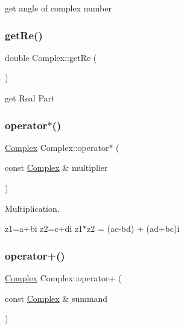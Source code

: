 get angle of complex number 

\mbox{\label{class_complex_a5e43de61a58eab8420b70eb2974e6b0b}} 
\subsubsection{\texorpdfstring{get\+Re()}{getRe()}}
{\footnotesize\ttfamily double Complex\+::get\+Re (\begin{DoxyParamCaption}{ }\end{DoxyParamCaption})}



get Real Part 

\mbox{\label{class_complex_a99935ad84f8b979344d68485c42462c7}} 
\subsubsection{\texorpdfstring{operator$\ast$()}{operator*()}}
{\footnotesize\ttfamily \mbox{\hyperlink{class_complex}{Complex}} Complex\+::operator$\ast$ (\begin{DoxyParamCaption}\item[{const \mbox{\hyperlink{class_complex}{Complex}} \&}]{multiplier }\end{DoxyParamCaption})}



Multiplication. 

z1=a+bi z2=c+di z1$\ast$z2 = (ac-\/bd) + (ad+bc)i \mbox{\label{class_complex_a4c1189414fa16c6d8115c90ce2f29d78}} 
\subsubsection{\texorpdfstring{operator+()}{operator+()}}
{\footnotesize\ttfamily \mbox{\hyperlink{class_complex}{Complex}} Complex\+::operator+ (\begin{DoxyParamCaption}\item[{const \mbox{\hyperlink{class_complex}{Complex}} \&}]{summand }\end{DoxyParamCaption})}



